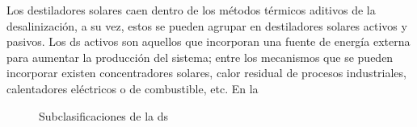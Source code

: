 		Los destiladores solares caen dentro de los métodos térmicos aditivos de la desalinización, a su vez, estos se pueden agrupar en destiladores solares activos y pasivos. Los \acrshort{ds} activos son aquellos que incorporan una fuente de energía externa para aumentar la producción del sistema; entre los mecanismos que se pueden incorporar existen concentradores solares, calor residual de procesos industriales, calentadores eléctricos o de combustible, etc. En la
		
		\begin{figure}[H]
			\centering
			
			\caption{Subclasificaciones de la \acrlong{ds}}
			\label{fig:destilación-solar}
		\end{figure}
		
		